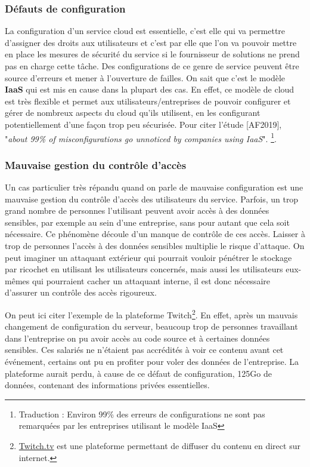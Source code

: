 \documentclass[a4paper, 12pt]{article}
\begin{document}
\begin{spacing}{1.1}
      \subsubsection{Défauts de configuration}
        La configuration d'un service cloud est essentielle, c'est elle qui va
        permettre d'assigner des droits aux utilisateurs et c'est par elle que
        l'on va pouvoir mettre en place les mesures de sécurité du service si le
        fournisseur de solutions ne prend pas en charge cette tâche. Des
        configurations de ce genre de service peuvent être source d'erreurs et
        mener à l'ouverture de failles. On sait que c'est le modèle
        \textbf{IaaS} qui est mis en cause dans la plupart des cas. En effet, ce
        modèle de cloud est très flexible et permet aux utilisateurs/entreprises
        de pouvoir configurer et gérer de nombreux aspects du cloud qu'ils
        utilisent, en les configurant potentiellement d'une façon trop peu
        sécurisée. Pour citer l'étude [AF2019], "\textit{about 99\% of
        misconfigurations go unnoticed by companies using IaaS}".
        \footnote{Traduction : Environ 99\% des erreurs de configurations ne
        sont pas remarquées par les entreprises utilisant le modèle IaaS}.

      \subsubsection{Mauvaise gestion du contrôle d'accès}
        Un cas particulier très répandu quand on parle de mauvaise configuration
        est une mauvaise gestion du contrôle d'accès des utilisateurs du
        service. Parfois, un trop grand nombre de personnes l'utilisant peuvent
        avoir accès à des données sensibles, par exemple au sein d'une
        entreprise, sans pour autant que cela soit nécessaire. Ce phénomène
        découle d'un manque de contrôle de ces accès. Laisser à trop de
        personnes l'accès à des données sensibles multiplie le risque d'attaque.
        On peut imaginer un attaquant extérieur qui pourrait vouloir pénétrer le
        stockage par ricochet en utilisant les utilisateurs concernés, mais
        aussi les utilisateurs eux-mêmes qui pourraient cacher un attaquant
        interne, il est donc nécessaire d'assurer un contrôle des accès
        rigoureux.

        On peut ici citer l'exemple de la plateforme Twitch\footnote{
        \url{Twitch.tv} est une plateforme permettant de diffuser du contenu en
        direct sur internet.}. En effet, après un mauvais changement de
        configuration du serveur, beaucoup trop de personnes travaillant dans
        l'entreprise on pu avoir accès au code source et à certaines données
        sensibles. Ces salariés ne n'étaient pas accrédités à voir ce contenu
        avant cet événement, certains ont pu en profiter pour voler des données
        de l'entreprise. La plateforme aurait perdu, à cause de ce défaut de
        configuration, 125Go de données, contenant des informations privées
        essentielles.


\end{spacing}
\end{document}
